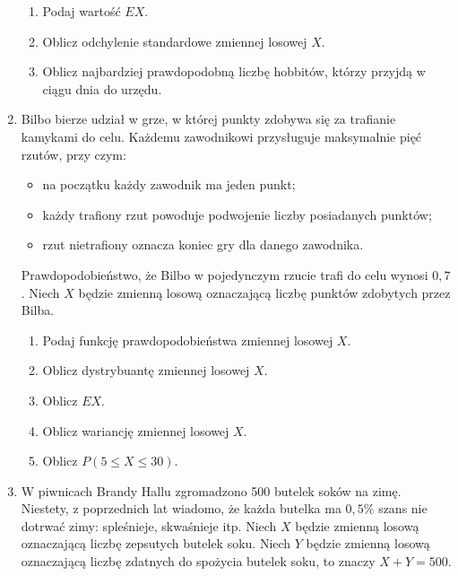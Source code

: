 \documentclass{mwart}
\begin{document}
\begin{enumerate}
\begin{enumerate}
\item Podaj wartość $EX$.
\item Oblicz odchylenie standardowe zmiennej losowej $X$.
\item Oblicz najbardziej prawdopodobną liczbę hobbitów, którzy przyjdą w ciągu dnia do urzędu.
\end{enumerate}
\clearpage
\item Bilbo bierze udział w grze, w której punkty zdobywa się za trafianie kamykami do celu. Każdemu zawodnikowi przysługuje maksymalnie pięć rzutów, przy czym:
\begin{itemize}
\item na początku każdy zawodnik ma jeden punkt;
\item każdy trafiony rzut powoduje podwojenie liczby posiadanych punktów;
\item rzut nietrafiony oznacza koniec gry dla danego zawodnika.
\end{itemize}
Prawdopodobieństwo, że Bilbo w pojedynczym rzucie trafi do celu wynosi $0{,}7$. Niech $X$ będzie zmienną losową oznaczającą liczbę punktów zdobytych przez
Bilba.
\begin{enumerate}
\item Podaj funkcję prawdopodobieństwa zmiennej losowej $X$.
\item Oblicz dystrybuantę zmiennej losowej $X$.
\item Oblicz $EX$.
\item Oblicz wariancję zmiennej losowej $X$.
\item Oblicz $P(5\leq X\leq 30)$.
\end{enumerate}
\item W piwnicach Brandy Hallu zgromadzono 500 butelek soków na zimę.
Niestety, z poprzednich lat wiadomo, że każda butelka ma $0{,}5\%$ szans nie dotrwać zimy: spleśnieje, skwaśnieje itp.
Niech $X$ będzie zmienną losową oznaczającą liczbę zepsutych butelek soku.
Niech $Y$ będzie zmienną losową oznaczającą liczbę zdatnych do spożycia butelek soku, to znaczy $X+Y=500$.


\end{enumerate}
\end{document}
